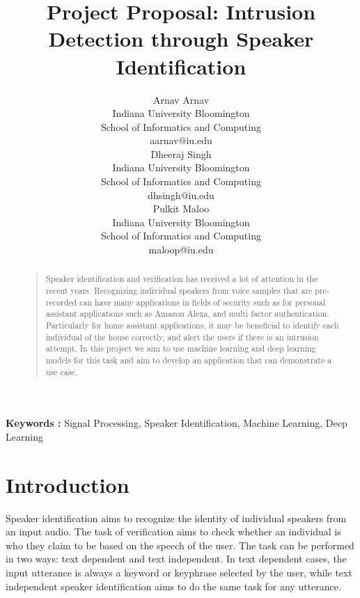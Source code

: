 \documentclass[letterpaper]{article}
\begin{document}
%
\title{Project Proposal: Intrusion Detection through Speaker Identification}
\author{%
    Arnav Arnav\\
    Indiana University Bloomington \\
    School of Informatics and Computing \\
    aarnav@iu.edu \\
    \And
    Dheeraj Singh\\
    Indiana University Bloomington \\
    School of Informatics and Computing \\
    dhsingh@iu.edu \\
    \And
    Pulkit Maloo\\
    Indiana University Bloomington \\
    School of Informatics and Computing \\
    maloop@iu.edu \\
}
\maketitle
\begin{abstract}
\begin{quote}
Speaker identification and verification has received a lot of attention in the recent years. Recognizing individual speakers from voice samples that are pre-recorded can have many applications in fields of security such as for personal assistant applications such as Amazon Alexa, and multi factor authentication. Particularly for home assistant applications, it may be beneficial to identify each individual of the house correctly, and alert the users if there is an intrusion attempt. In this project we aim to use machine learning and deep learning models for this task and aim to develop an application that can demonstrate a use case.

\end{quote}
\end{abstract}

\textbf{Keywords :} Signal Processing, Speaker Identification, Machine Learning, Deep Learning


\section{Introduction}
Speaker identification aims to recognize the identity of individual speakers from an input audio. The task of verification aims to check whether an individual is who they claim to be based on the speech of the user. The task can be performed in two ways: text dependent and text independent.  In text dependent cases, the input utterance is always a keyword or keyphrase selected by the user, while text independent speaker identification aims to do the same task for any utterance. \cite{cassidy-speech}
\end{document}
